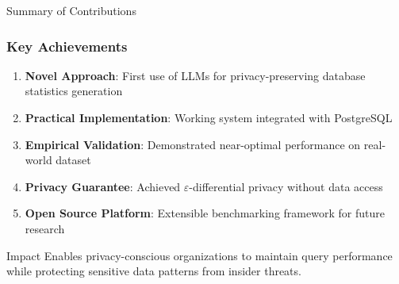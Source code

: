 \documentclass{beamer}
\begin{document}
\begin{frame}{Summary of Contributions}
\frametitle{Key Achievements}

\begin{enumerate}
    \item \textbf{Novel Approach}: First use of LLMs for privacy-preserving database statistics generation
    
    \item \textbf{Practical Implementation}: Working system integrated with PostgreSQL
    
    \item \textbf{Empirical Validation}: Demonstrated near-optimal performance on real-world dataset
    
    \item \textbf{Privacy Guarantee}: Achieved $\varepsilon$-differential privacy without data access
    
    \item \textbf{Open Source Platform}: Extensible benchmarking framework for future research
\end{enumerate}

\vspace{0.5cm}

\begin{block}{Impact}
Enables privacy-conscious organizations to maintain query performance while protecting sensitive data patterns from insider threats.
\end{block}

\end{frame}
\end{document}

